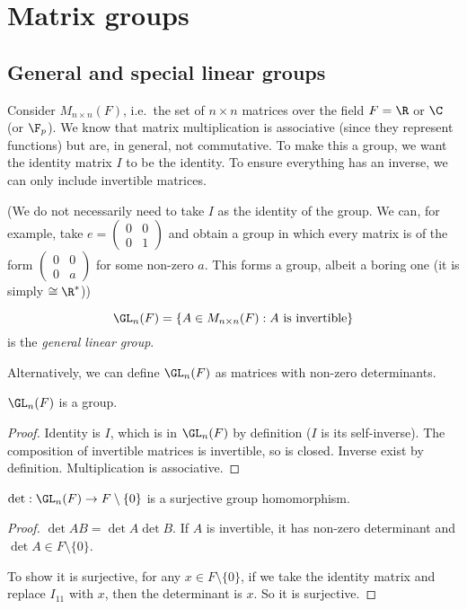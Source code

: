 \documentclass[a4paper]{article}
\begin{document}
\section{Matrix groups}
\subsection{General and special linear groups}
Consider $M_{n\times n}(F)$, i.e.\ the set of $n\times n$ matrices over the field $F = \R$ or $\C$ (or $\F_p$). We know that matrix multiplication is associative (since they represent functions) but are, in general, not commutative. To make this a group, we want the identity matrix $I$ to be the identity. To ensure everything has an inverse, we can only include invertible matrices.

(We do not necessarily need to take $I$ as the identity of the group. We can, for example, take $e =
\begin{pmatrix}
  0 & 0\\
  0 & 1
\end{pmatrix}$ and obtain a group in which every matrix is of the form $\begin{pmatrix}
  0 & 0\\
  0 & a
\end{pmatrix}$ for some non-zero $a$. This forms a group, albeit a boring one (it is simply $\cong \R^*$))
\begin{defi}
  \[
    \GL_n(F) = \{A\in M_{n\times n}(F) : A\text{ is invertible}\}
  \]
  is the \emph{general linear group}.
\end{defi}
Alternatively, we can define $\GL_n(F)$ as matrices with non-zero determinants.

\begin{prop}
  $\GL_n(F)$ is a group.
\end{prop}
\begin{proof}
  Identity is $I$, which is in $\GL_n(F)$ by definition ($I$ is its self-inverse). The composition of invertible matrices is invertible, so is closed. Inverse exist by definition. Multiplication is associative.
\end{proof}

\begin{prop}
  $\det: \GL_n(F) \to F\setminus\{0\}$ is a surjective group homomorphism.
\end{prop}

\begin{proof}
  $\det AB = \det A\det B$. If $A$ is invertible, it has non-zero determinant and $\det A\in F\setminus\{0\}$.

  To show it is surjective, for any $x\in F\setminus\{0\}$, if we take the identity matrix and replace $I_{11}$ with $x$, then the determinant is $x$. So it is surjective.
\end{proof}
\end{document}
